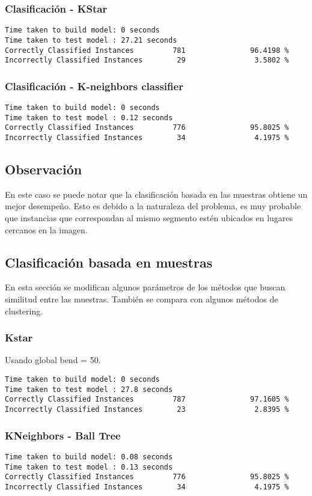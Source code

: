 \documentclass[a4paper]{article}
\begin{document}
\subsubsection{Clasificación - KStar}
\begin{verbatim}
Time taken to build model: 0 seconds
Time taken to test model : 27.21 seconds
Correctly Classified Instances         781               96.4198 %
Incorrectly Classified Instances        29                3.5802 %
\end{verbatim}

\subsubsection{Clasificación - K-neighbors classifier}
\begin{verbatim}
Time taken to build model: 0 seconds
Time taken to test model : 0.12 seconds
Correctly Classified Instances         776               95.8025 %
Incorrectly Classified Instances        34                4.1975 %
\end{verbatim}

\subsection*{Observación}
En este caso se puede notar que la clasificación basada
en las muestras obtiene un mejor desempeño. Esto es debido
a la naturaleza del problema, es muy probable que
instancias que correspondan al mismo segmento estén ubicados
en lugares cercanos en la imagen.

\subsection{Clasificación basada en muestras}
En esta sección se modifican algunos parámetros de los métodos
que buscan similitud entre las muestras. También se compara
con algunos métodos de clustering.
\subsubsection {Kstar}
Usando global bend = 50.
\begin{verbatim}
Time taken to build model: 0 seconds
Time taken to test model : 27.8 seconds
Correctly Classified Instances         787               97.1605 %
Incorrectly Classified Instances        23                2.8395 %
\end{verbatim}

\subsubsection{KNeighbors - Ball Tree}
\begin{verbatim}
Time taken to build model: 0.08 seconds
Time taken to test model : 0.13 seconds
Correctly Classified Instances         776               95.8025 %
Incorrectly Classified Instances        34                4.1975 %
\end{verbatim}
\end{document}
